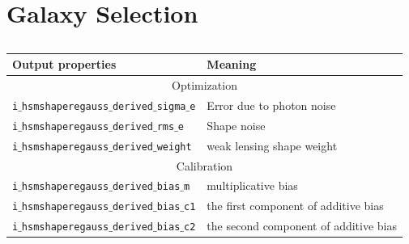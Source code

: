 \documentclass[useamsfonts]{pasj01}
\begin{document}
\section*{Galaxy Selection}
\begin{table}
\centering
  \begin{tabular}{ll} \hline
    Output properties & Meaning \\ \hline
\multicolumn{2}{c}{Optimization} \\ \hline
\texttt{i$\_$hsmshaperegauss$\_$derived$\_$sigma$\_$e}& Error due to photon noise \\ \hline
\texttt{i$\_$hsmshaperegauss$\_$derived$\_$rms$\_$e}  & Shape noise\\ \hline
\texttt{i$\_$hsmshaperegauss$\_$derived$\_$weight}    & weak lensing shape weight\\ \hline
\multicolumn{2}{c}{Calibration} \\ \hline
\texttt{i$\_$hsmshaperegauss$\_$derived$\_$bias$\_$m} & multiplicative bias\\ \hline
\texttt{i$\_$hsmshaperegauss$\_$derived$\_$bias$\_$c1}& the first component of additive bias\\ \hline
\texttt{i$\_$hsmshaperegauss$\_$derived$\_$bias$\_$c2}& the second component of additive bias\\ \hline
\hline
  \end{tabular}
  \caption{}
\end{table}





\appendix
\end{document}
